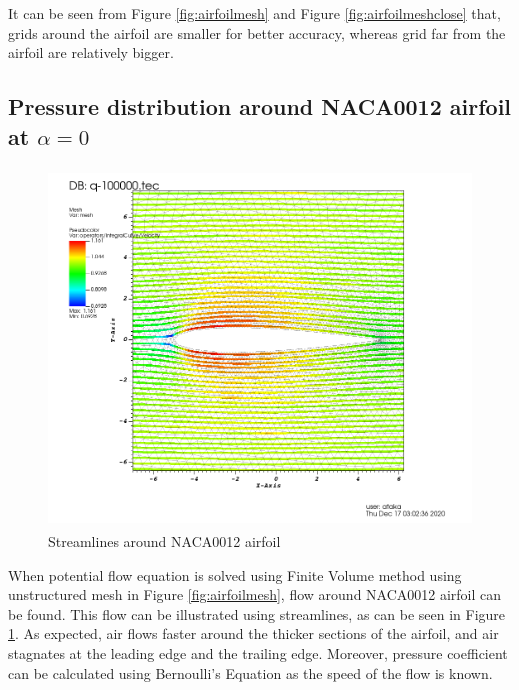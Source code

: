 \documentclass[letterpaper,12pt]{article}
\begin{document}
\vspace{1cm}

It can be seen from Figure \ref{fig:airfoilmesh} and Figure \ref{fig:airfoilmeshclose} that, grids around 
the airfoil are smaller for better accuracy, whereas grid far from the airfoil are relatively bigger.
\newpage

\subsection{Pressure distribution around NACA0012 airfoil at $\alpha = 0$}

\begin{figure} [!h]
	\centering
	\includegraphics[height = 9.5cm]{graph/medium/medium_streamline0000.png}
	\caption{Streamlines around NACA0012 airfoil}
    \label{fig:airfoilstreamline}
\end{figure}

\vspace{1cm}

When potential flow equation is solved using Finite Volume method using unstructured mesh in Figure \ref{fig:airfoilmesh},
flow around NACA0012 airfoil can be found. This flow can be illustrated using streamlines, as can be seen in 
Figure \ref{fig:airfoilstreamline}. As expected, air flows faster around the thicker sections of the airfoil, 
and air stagnates at the leading edge and the trailing edge. Moreover, pressure coefficient can be calculated using Bernoulli's Equation 
as the speed of the flow is known.

\newpage
\end{document}
